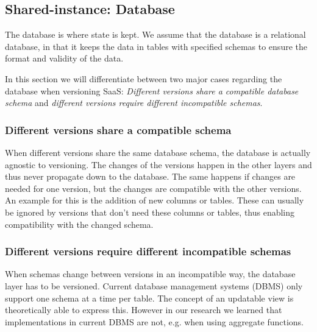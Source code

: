 %
%
%

\subsection{Shared-instance: Database}
\label{sec:database}

The database is where state is kept. We assume that the database is a relational database, in that it keeps the data in tables with specified schemas to ensure the format and validity of the data.

In this section we will differentiate between two major cases regarding the database when versioning SaaS: \emph{Different versions share a compatible database schema} and \emph{different versions require different incompatible schemas}.

\subsubsection{Different versions share a compatible schema}

When different versions share the same database schema, the database is actually agnostic to versioning. The changes of the versions happen in the other layers and thus never propagate down to the database. The same happens if changes are needed for one version, but the changes are compatible with the other versions. An example for this is the addition of new columns or tables. These can usually be ignored by versions that don't need these columns or tables, thus enabling compatibility with the changed schema.

\subsubsection{Different versions require different incompatible schemas}

When schemas change between versions in an incompatible way, the database layer has to be versioned. Current database management systems (DBMS) only support one schema at a time per table. The concept of an updatable view is theoretically able to express this. However in our research we learned that implementations in current DBMS are not, e.g. when using aggregate functions.

